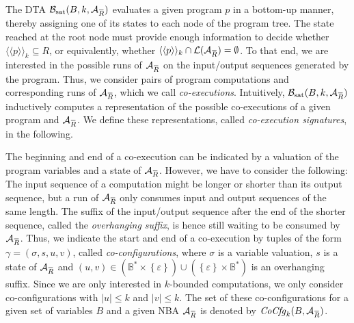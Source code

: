 \documentclass[submission,copyright,creativecommons]{eptcs}
\newcommand{\overbar}[1]{\mkern 1.5mu\overline{\mkern-1.5mu#1\mkern-1.5mu}\mkern 1.5mu}\newcommand{\nothing}{$\,$}
\newcommand{\z}[1]{\text{#1}}
\newcommand{\set}[1]{\left\{ #1 \right\}}
\newcommand{\aut}[1]{\mathcal{#1}}
\newcommand{\specaut}{\aut{A}_{\overbar{R}}}
\newcommand{\lang}[1]{\mathcal{#1}}
\newcommand{\f}[1]{\mathit{#1}}
\newcommand{\sembrackk}[1]{\langle\langle #1 \rangle\rangle}\newcommand{\lbar}[1]{\overline{#1}}
\newcommand{\cocfgk}{\f{CoCfg}_k(B,\specaut)}
\newcommand{\kfg}{\gamma}
\newcommand{\sigmain}{\mathbb{B}}
\newcommand{\sigmaout}{\mathbb{B}}
\begin{document}
The DTA $\aut{B}_\z{sat}(B,k,\specaut)$ evaluates a given program $p$ in a
bottom-up manner, thereby assigning one of its states to each node of the
program tree.
The state reached at the root node must provide
enough information to decide whether $\sembrackk{p}_k \subseteq R$,
or equivalently, whether
$\sembrackk{p}_k \cap \lang{L}(\specaut) = \emptyset$.
To that end, we are interested in the possible runs of $\specaut$
on the input/output sequences generated by the program.
Thus, we consider pairs of program computations and corresponding runs of
$\specaut$, which we call \emph{co-executions}.
Intuitively, $\aut{B}_\z{sat}(B,k,\specaut)$ inductively computes a
representation of the possible co-executions of a given program and
$\specaut$.
We define these representations, called \emph{co-execution signatures},
in the following.

The beginning and end of a co-execution can be indicated by
a valuation of the program variables and a state of $\specaut$.
However, we have to consider the following:
The input sequence of a computation might be longer or shorter than
its output sequence, but a run of $\specaut$ only consumes input and
output sequences of the same length.
The suffix of the input/output sequence after the end of the shorter sequence,
called the \emph{overhanging suffix}, is hence still waiting to be
consumed by $\specaut$.
Thus, we indicate the start and end of a co-execution by tuples of the
form $\kfg = (\sigma,s,u,v)$, called \emph{co-configurations},
where $\sigma$ is a variable valuation, $s$ is a state of $\specaut$ and
$(u,v) \in \left(\sigmain^* \times \set{\varepsilon}\right)
	\cup \left(\set{\varepsilon} \times \sigmaout^*\right)$ is an
overhanging suffix.
Since we are only interested in $k$-bounded computations, we only
consider co-configurations with $|u| \leq k$ and $|v| \leq k$.
The set of these co-configurations for a given set of variables $B$ and a
given NBA $\specaut$ is denoted by $\cocfgk$.
\end{document}
